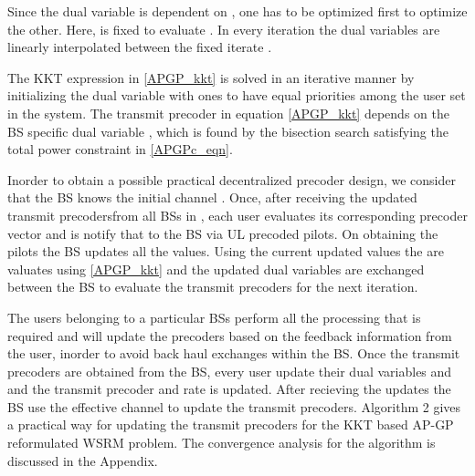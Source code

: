 Since the dual variable  is dependent on , one has to be optimized first to optimize the other. Here,  is fixed to evaluate . In every iteration the dual variables are linearly interpolated between the fixed iterate .

The \ac{KKT} expression in \eqref{APGP_kkt} is solved in an iterative manner by initializing the dual variable  with ones to have equal priorities among the user set in the system. The transmit precoder  in equation \eqref{APGP_kkt} depends on the \ac{BS} specific dual variable , which is found by the bisection search satisfying the total power constraint in \eqref{APGPc_eqn}.

Inorder to obtain a possible practical decentralized precoder design, we consider that the \ac{BS}  knows the initial channel . Once, after receiving the updated transmit precodersfrom all \ac{BS}s in , each user evaluates its corresponding precoder vector and is notify that to the \ac{BS} via \ac{UL} precoded pilots. On obtaining the pilots the \ac{BS} updates all the values. Using the current updated values the  are valuates using \eqref{APGP_kkt} and the updated dual variables are exchanged between the \ac{BS} to evaluate the transmit precoders for the next iteration.

The users belonging to a particular \ac{BS}s perform all the processing that is required and will update the precoders based on the feedback information from the user, inorder to avoid back haul exchanges within the \ac{BS}. Once the transmit precoders are obtained from the \ac{BS}, every user update their dual variables  and  and the transmit precoder  and rate  is updated. After recieving the updates the \ac{BS} use the effective channel to update the transmit precoders. Algorithm 2 gives a practical way for updating the transmit precoders for the \ac{KKT} based AP-GP reformulated \ac{WSRM} problem. The convergence analysis for the algorithm is discussed in the Appendix.

